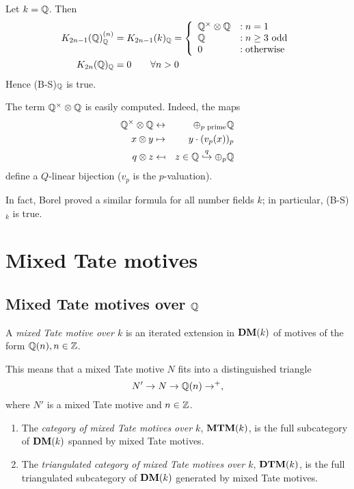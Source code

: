 \begin{thm}[Borel]\label{thm:9-borel}
  Let $k = \mathbb{Q}$. Then
  \begin{align*}
    K_{2n-1}(\mathbb{Q})_{\mathbb{Q}}^{(n)} &= K_{2n-1}(k)_{\mathbb{Q}} = \left\{ \begin{array}{ll}
        \mathbb{Q}^{\times} \otimes \mathbb{Q} &:n=1 \\
        \mathbb{Q} &:\textrm{$n\geq 3$ odd} \\
        0 &:\textrm{otherwise}
      \end{array} \right.\\
    K_{2n}(\mathbb{Q})_{\mathbb{Q}} &= 0 \qquad \forall n>0
  \end{align*}
  Hence (B-S)$_{\mathbb{Q}}$ is true.
\end{thm}

The term $\mathbb{Q}^{\times}\otimes\mathbb{Q}$ is easily computed. Indeed, the maps
\begin{eqnarray*}
  \mathbb{Q}^{\times}\otimes \mathbb{Q}&\leftrightarrow&\oplus_{p\text{ prime}}\mathbb{Q}\\
  x\otimes y&\mapsto&y\cdot(v_{p}(x))_{p}\\
  q\otimes z&\mapsfrom&z\in \mathbb{Q}\stackrel{q}{\hookrightarrow}\oplus_{p}\mathbb{Q}
\end{eqnarray*}
define a $Q$-linear bijection ($v_{p}$ is the $p$-valuation).
\begin{rem}
  In fact, Borel proved a similar formula for all number fields $k$;
  in particular, (B-S)$_{k}$ is true.
\end{rem}
\section{Mixed Tate motives}
\label{sec:9-tate}
\subsection{Mixed Tate motives over $\mathbb{Q}$}

\begin{defn}
  A \emph{mixed Tate motive over $k$} is an iterated extension in
  $\mathbf{DM}(k)$ of motives of the form $\mathbb{Q}(n), n \in \mathbb{Z}$.
\end{defn}
This means that a mixed Tate motive $N$ fits into a distinguished triangle
\begin{equation*}
  N'\to N\to \mathbb{Q}(n)\to^{+},
\end{equation*}
where $N'$ is a mixed Tate motive and $n\in\mathbb{Z}$.
\begin{defn}
  \begin{enumerate}
  \item The \emph{category of mixed Tate motives over $k$}, $\mathbf{MTM}(k)$,
    is the full subcategory of $\mathbf{DM}(k)$ spanned by mixed Tate motives.
  \item The \emph{triangulated category of mixed Tate motives over
      $k$}, $\mathbf{DTM}(k)$, is the full triangulated subcategory of
    $\mathbf{DM}(k)$ generated by mixed Tate motives.
  \end{enumerate}
\end{defn}

